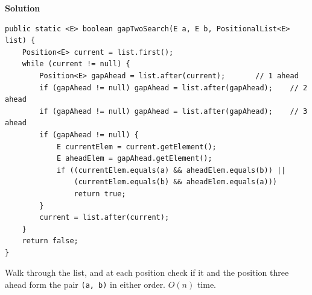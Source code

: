 \documentclass{article}
\begin{document}
{\color{blue}
\noindent\textbf{Solution}

\begin{lstlisting}[basicstyle=\ttfamily\footnotesize\color{blue},
  keywordstyle=\bfseries\color{blue!70!black},
  commentstyle=\color{blue!50}]
public static <E> boolean gapTwoSearch(E a, E b, PositionalList<E> list) {
    Position<E> current = list.first();
    while (current != null) {
        Position<E> gapAhead = list.after(current);       // 1 ahead
        if (gapAhead != null) gapAhead = list.after(gapAhead);    // 2 ahead
        if (gapAhead != null) gapAhead = list.after(gapAhead);    // 3 ahead
        if (gapAhead != null) {
            E currentElem = current.getElement();
            E aheadElem = gapAhead.getElement();
            if ((currentElem.equals(a) && aheadElem.equals(b)) ||
                (currentElem.equals(b) && aheadElem.equals(a)))
                return true;
        }
        current = list.after(current);
    }
    return false;
}
\end{lstlisting}

\noindent Walk through the list, and at each position check if it and the position three ahead form the pair \texttt{(a, b)} in either order. $O(n)$ time.
}
\end{document}
